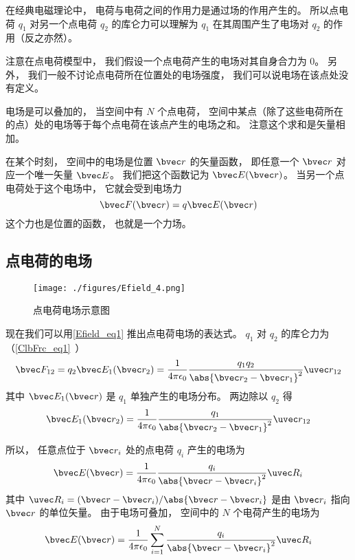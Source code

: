 
在经典电磁理论中， 电荷与电荷之间的作用力是通过场的作用产生的。 所以点电荷 $q_1$ 对另一个点电荷 $q_2$ 的库仑力可以理解为 $q_1$ 在其周围产生了电场对 $q_2$ 的作用（反之亦然）。

注意在点电荷模型中， 我们假设一个点电荷产生的电场对其自身合力为 0。 另外， 我们一般不讨论点电荷所在位置处的电场强度， 我们可以说电场在该点处没有定义。

电场是可以叠加的， 当空间中有 $N$ 个点电荷， 空间中某点（除了这些电荷所在的点）处的电场等于每个点电荷在该点产生的电场之和。 注意这个求和是矢量相加。

在某个时刻， 空间中的电场是位置 $\bvec r$ 的矢量函数， 即任意一个 $\bvec r$ 对应一个唯一矢量 $\bvec E$。 我们把这个函数记为 $\bvec E(\bvec r)$。 当另一个点电荷处于这个电场中， 它就会受到电场力
\begin{equation}\label{Efield_eq1}
\bvec F(\bvec r) = q \bvec E(\bvec r)
\end{equation}
这个力也是位置的函数， 也就是一个力场。
 
\subsection{点电荷的电场}
\begin{figure}[ht]
\centering
\texttt{[image: ./figures/Efield\_4.png]}
\caption{点电荷电场示意图} \label{Efield_fig4}
\end{figure}
现在我们可以用\autoref{Efield_eq1} 推出点电荷电场的表达式。 $q_1$ 对 $q_2$ 的库仑力为（\autoref{ClbFrc_eq1}~）
\begin{equation}\label{Efield_eq3}
\bvec F_{12} = q_2 \bvec E_1(\bvec r_2) = \frac{1}{4\pi\epsilon_0}\frac{q_1 q_2}{\abs{\bvec r_2 - \bvec r_1}^2} \uvec r_{12}
\end{equation}
其中 $\bvec E_1(\bvec r)$ 是 $q_1$ 单独产生的电场分布。 两边除以 $q_2$ 得
\begin{equation}
\bvec E_1(\bvec r_2) = \frac{1}{4\pi\epsilon_0}\frac{q_1}{\abs{\bvec r_2 - \bvec r_1}^2} \uvec r_{12}
\end{equation}

所以， 任意点位于 $\bvec r_i$ 处的点电荷 $q_i$ 产生的电场为
\begin{equation}\label{Efield_eq4}
\bvec E(\bvec r) = \frac{1}{4\pi\epsilon_0}\frac{q_i}{\abs{\bvec r - \bvec r_i}^2} \uvec R_i
\end{equation}
其中 $\uvec R_i = (\bvec r - \bvec r_i) / \abs{\bvec r - \bvec r_i}$ 是由 $\bvec r_i$ 指向 $\bvec r$ 的单位矢量。 由于电场可叠加， 空间中的 $N$ 个电荷产生的电场为
\begin{equation}\label{Efield_eq2}
\bvec E(\bvec r) = \frac{1}{4\pi\epsilon_0} \sum_{i=1}^N \frac{q_i}{\abs{\bvec r - \bvec r_i}^2} \uvec R_i
\end{equation}

